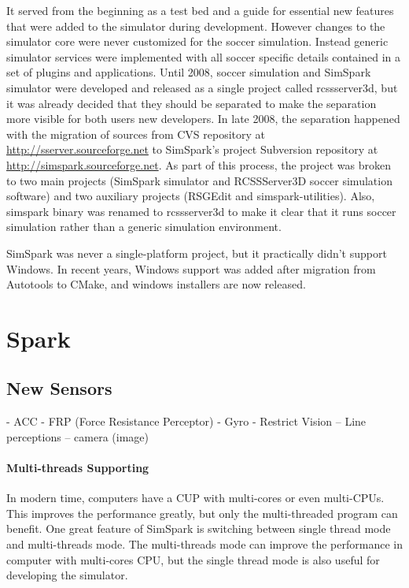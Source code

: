 \documentclass{llncs}
\begin{document}
It served from the beginning as a test bed and a guide for essential new features that were added to the simulator during development. However changes to the simulator core were never customized for the soccer simulation. Instead generic simulator services were implemented with all soccer specific details contained in a set of plugins and applications. Until 2008, soccer simulation and SimSpark simulator were developed and released as a single project called rcssserver3d, but it was already decided that they should be separated 
to make the separation more visible for both users new developers. 
In late 2008, the separation happened with the migration of sources from CVS repository
at \url{http://sserver.sourceforge.net} to SimSpark's project Subversion repository at 
\url{http://simspark.sourceforge.net}. As part of this process, the project was broken
to two main projects (SimSpark simulator and RCSSServer3D soccer simulation software) 
and two auxiliary projects (RSGEdit and simspark-utilities). Also, simspark binary was 
renamed to rcssserver3d to make it clear that it runs soccer simulation rather than a 
generic simulation environment.

SimSpark was never a single-platform project, but it practically didn't support 
Windows. In recent years, Windows support was added after migration from Autotools
to CMake, and windows installers are now released. 

\section{Spark}
\label{s:spark}
\subsection{New Sensors}
 - ACC
 - FRP (Force Resistance Perceptor)
 - Gyro
 - Restrict Vision
 -- Line perceptions
 -- camera (image)


\paragraph{Multi-threads Supporting}
In modern time, computers have a CUP with multi-cores or even multi-CPUs.
This improves the performance greatly, but only the multi-threaded program can benefit.
One great feature of SimSpark is switching between single thread mode and multi-threads
mode. The multi-threads mode can improve the performance in computer with multi-cores CPU, but the single thread mode is also useful for developing the simulator. 
\end{document}
